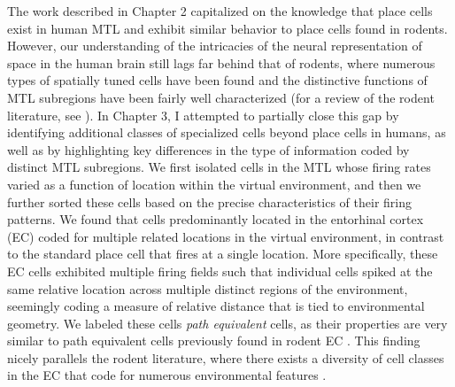 The work described in Chapter 2 capitalized on the knowledge that place cells exist in human MTL and exhibit similar behavior to place cells found in rodents. However, our understanding of the intricacies of the neural representation of space in the human brain still lags far behind that of rodents, where numerous types of spatially tuned cells have been found and the distinctive functions of MTL subregions have been fairly well characterized (for a review of the rodent literature, see \cite{MoseEtal08}). In Chapter 3, I attempted to partially close this gap by identifying additional classes of specialized cells beyond place cells in humans, as well as by highlighting key differences in the type of information coded by distinct MTL subregions. We first isolated cells in the MTL whose firing rates varied as a function of location within the virtual environment, and then we further sorted these cells based on the precise characteristics of their firing patterns. We found that cells predominantly located in the entorhinal cortex (EC) coded for multiple related locations in the virtual environment, in contrast to the standard place cell that  fires at a single location. More specifically, these EC cells exhibited multiple firing fields such that individual cells spiked at the same relative location across multiple distinct regions of the environment, seemingly coding a measure of relative distance that is tied to environmental geometry. We labeled these cells \textit{path equivalent} cells, as their properties are very similar to path equivalent cells previously found in rodent EC \citep{FranEtal00}. This finding nicely parallels the rodent literature, where there exists a diversity of cell classes in the EC that code for numerous environmental features \citep{HaftEtal05,FyhnEtal04,DerdEtal09,SargEtal06,SolsEtal08}.

